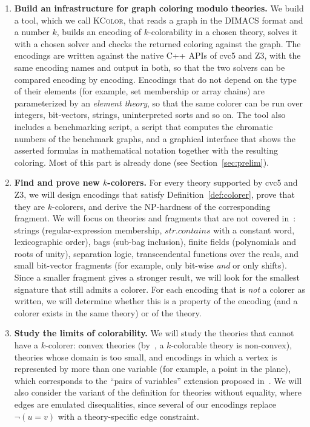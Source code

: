 \documentclass[12pt,a4paper]{article}
\newcommand{\tool}{\textsc{KColor}}
\theoremstyle{definition}
\begin{document}
\begin{enumerate}
  \item \textbf{Build an infrastructure for graph coloring modulo theories.}
    We build a tool, which we call \tool{}, that reads a graph in the DIMACS
    format and a number $k$, builds an encoding of $k$-colorability in a chosen
    theory, solves it with a chosen solver and checks the returned coloring against
    the graph. The encodings are written against the native C++ APIs of cvc5 and Z3,
    with the same encoding names and output in both, so that the two solvers can be
    compared encoding by encoding. Encodings that do not depend on the type of their
    elements (for example, set membership or array chains) are parameterized by an
    \emph{element theory}, so that the same colorer can be run over integers,
    bit-vectors, strings, uninterpreted sorts and so on. The tool also includes a
    benchmarking script, a script that computes the chromatic numbers of the
    benchmark graphs, and a graphical interface that shows the asserted formulas in
    mathematical notation together with the resulting coloring. Most of this part
    is already done (see Section~\ref{sec:prelim}).

  \item \textbf{Find and prove new $k$-colorers.} For every theory supported by
    cvc5 and Z3, we will design encodings that satisfy Definition~\ref{def:colorer},
    prove that they are $k$-colorers, and derive the NP-hardness of the
    corresponding fragment. We will focus on theories and fragments that are not
    covered in~\cite{Sebastiani16}: strings (regular-expression membership,
    $\mathit{str.contains}$ with a constant word, lexicographic order),
    bags (sub-bag inclusion), finite fields (polynomials and roots of unity),
    separation logic, transcendental functions over the reals, and small
    bit-vector fragments (for example, only bit-wise \emph{and} or only shifts).
    Since a smaller fragment gives a stronger result, we will look for the smallest
    signature that still admits a colorer. For each encoding that is \emph{not} a
    colorer as written, we will determine whether this is a property of the
    encoding (and a colorer exists in the same theory) or of the theory.

  \item \textbf{Study the limits of colorability.} We will study the theories that
    cannot have a $k$-colorer: convex theories (by~\cite{Sebastiani16}, a
    $k$-colorable theory is non-convex), theories whose domain is too small, and
    encodings in which a vertex is represented by more than one variable (for
    example, a point in the plane), which corresponds to the ``pairs of variables''
    extension proposed in~\cite{Sebastiani16}. We will also consider the variant of
    the definition for theories without equality, where edges are emulated
    disequalities, since several of our encodings replace $\neg(u = v)$ with a
    theory-specific edge constraint.


\end{enumerate}
\end{document}
